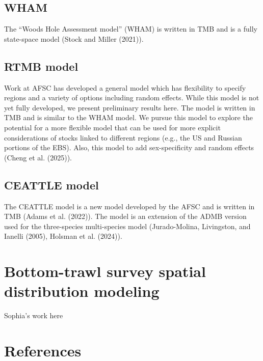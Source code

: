 \documentclass[
  letterpaper,
  DIV=11,
  numbers=noendperiod]{scrreprt}
\begin{document}
\section{WHAM}\label{wham}

The ``Woods Hole Assessment model'' (WHAM) is written in TMB and is a
fully state-space model (Stock and Miller (2021)).

\section{RTMB model}\label{rtmb-model}

Work at AFSC has developed a general model which has flexibility to
specify regions and a variety of options including random effects. While
this model is not yet fully developed, we present preliminary results
here. The model is written in TMB and is similar to the WHAM model. We
pursue this model to explore the potential for a more flexible model
that can be used for more explicit considerations of stocks linked to
different regions (e.g., the US and Russian portions of the EBS). Also,
this model to add sex-specificity and random effects (Cheng et al.
(2025)).

\section{CEATTLE model}\label{ceattle-model}

The CEATTLE model is a new model developed by the AFSC and is written in
TMB (Adams et al. (2022)). The model is an extension of the ADMB version
used for the three-species multi-species model (Jurado-Molina,
Livingston, and Ianelli (2005), Holsman et al. (2024)).

\chapter{Bottom-trawl survey spatial distribution
modeling}\label{bottom-trawl-survey-spatial-distribution-modeling}

Sophia's work here

\chapter*{References}\label{references}
\end{document}
